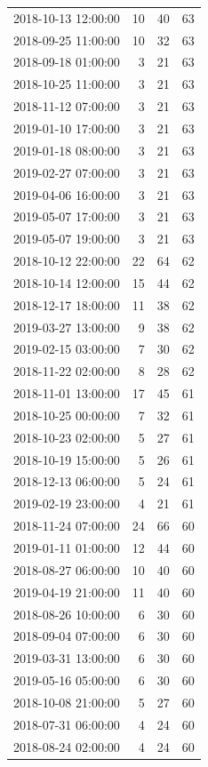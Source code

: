 \begin{tabular}{lrrr}
2018-10-13 12:00:00 & 10 & 40 & 63 \\
2018-09-25 11:00:00 & 10 & 32 & 63 \\
2018-09-18 01:00:00 & 3 & 21 & 63 \\
2018-10-25 11:00:00 & 3 & 21 & 63 \\
2018-11-12 07:00:00 & 3 & 21 & 63 \\
2019-01-10 17:00:00 & 3 & 21 & 63 \\
2019-01-18 08:00:00 & 3 & 21 & 63 \\
2019-02-27 07:00:00 & 3 & 21 & 63 \\
2019-04-06 16:00:00 & 3 & 21 & 63 \\
2019-05-07 17:00:00 & 3 & 21 & 63 \\
2019-05-07 19:00:00 & 3 & 21 & 63 \\
2018-10-12 22:00:00 & 22 & 64 & 62 \\
2018-10-14 12:00:00 & 15 & 44 & 62 \\
2018-12-17 18:00:00 & 11 & 38 & 62 \\
2019-03-27 13:00:00 & 9 & 38 & 62 \\
2019-02-15 03:00:00 & 7 & 30 & 62 \\
2018-11-22 02:00:00 & 8 & 28 & 62 \\
2018-11-01 13:00:00 & 17 & 45 & 61 \\
2018-10-25 00:00:00 & 7 & 32 & 61 \\
2018-10-23 02:00:00 & 5 & 27 & 61 \\
2018-10-19 15:00:00 & 5 & 26 & 61 \\
2018-12-13 06:00:00 & 5 & 24 & 61 \\
2019-02-19 23:00:00 & 4 & 21 & 61 \\
2018-11-24 07:00:00 & 24 & 66 & 60 \\
2019-01-11 01:00:00 & 12 & 44 & 60 \\
2018-08-27 06:00:00 & 10 & 40 & 60 \\
2019-04-19 21:00:00 & 11 & 40 & 60 \\
2018-08-26 10:00:00 & 6 & 30 & 60 \\
2018-09-04 07:00:00 & 6 & 30 & 60 \\
2019-03-31 13:00:00 & 6 & 30 & 60 \\
2019-05-16 05:00:00 & 6 & 30 & 60 \\
2018-10-08 21:00:00 & 5 & 27 & 60 \\
2018-07-31 06:00:00 & 4 & 24 & 60 \\
2018-08-24 02:00:00 & 4 & 24 & 60 \\

\end{tabular}
